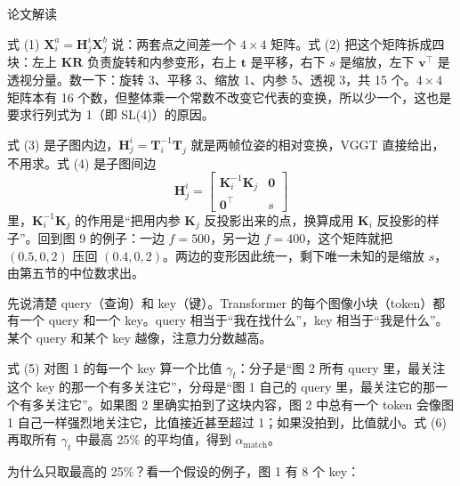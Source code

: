 \begin{interp}{论文解读}

式 (1) $\mathbf{X}_i^a=\mathbf{H}^i_j\mathbf{X}_j^b$ 说：两套点之间差一个 $4\times4$ 矩阵。式 (2) 把这个矩阵拆成四块：左上 $\mathbf{KR}$ 负责旋转和内参变形，右上 $\mathbf{t}$ 是平移，右下 $s$ 是缩放，左下 $\mathbf{v}^\top$ 是透视分量。数一下：旋转 3、平移 3、缩放 1、内参 5、透视 3，共 15 个。$4\times4$ 矩阵本有 16 个数，但整体乘一个常数不改变它代表的变换，所以少一个，这也是要求行列式为 1（即 SL(4)）的原因。


式 (3) 是子图内边，$\mathbf{H}^i_j=\mathbf{T}_i^{-1}\mathbf{T}_j$ 就是两帧位姿的相对变换，VGGT 直接给出，不用求。式 (4) 是子图间边
\[ \mathbf{H}^i_j=\begin{bmatrix}\mathbf{K}_i^{-1}\mathbf{K}_j&\mathbf{0}\\ \mathbf{0}^\top&s\end{bmatrix} \]
里，$\mathbf{K}_i^{-1}\mathbf{K}_j$ 的作用是“把用内参 $\mathbf{K}_j$ 反投影出来的点，换算成用 $\mathbf{K}_i$ 反投影的样子”。回到图 9 的例子：一边 $f=500$，另一边 $f=400$，这个矩阵就把 $(0.5,0,2)$ 压回 $(0.4,0,2)$。两边的变形因此统一，剩下唯一未知的是缩放 $s$，由第五节的中位数求出。


先说清楚 query（查询）和 key（键）。Transformer 的每个图像小块（token）都有一个 query 和一个 key。query 相当于“我在找什么”，key 相当于“我是什么”。某个 query 和某个 key 越像，注意力分数越高。

式 (5) 对图 1 的每一个 key 算一个比值 $\gamma_t$：分子是“图 2 所有 query 里，最关注这个 key 的那一个有多关注它”，分母是“图 1 自己的 query 里，最关注它的那一个有多关注它”。如果图 2 里确实拍到了这块内容，图 2 中总有一个 token 会像图 1 自己一样强烈地关注它，比值接近甚至超过 1；如果没拍到，比值就小。式 (6) 再取所有 $\gamma_t$ 中最高 25\% 的平均值，得到 $\alpha_{\text{match}}$。

为什么只取最高的 25\%？看一个假设的例子，图 1 有 8 个 key：


\end{interp}
